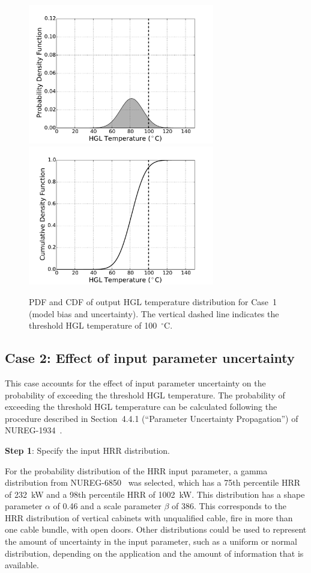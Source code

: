 \documentclass[12pt]{article}
\begin{document}
\begin{figure}[p]
\includegraphics[width=3.2in]{Figures/output_PDF_1_model}
\includegraphics[width=3.2in]{Figures/output_CDF_1_model}
\caption{PDF and CDF of output HGL temperature distribution for Case~1 (model bias and uncertainty). The vertical dashed line indicates the threshold HGL temperature of 100~$^\circ$C.}
\label{fig:case_1_output_distributions}
\end{figure}

\clearpage


\subsection{Case 2: Effect of input parameter uncertainty}

This case accounts for the effect of input parameter uncertainty on the probability of exceeding the threshold HGL temperature. The probability of exceeding the threshold HGL temperature can be calculated following the procedure described in Section~4.4.1 (``Parameter Uncertainty Propagation'') of NUREG-1934~\cite{NUREG_1934}.

\textbf{Step 1}: Specify the input HRR distribution.

For the probability distribution of the HRR input parameter, a gamma distribution from NUREG-6850~\cite{NUREG_6850} was selected, which has a 75th percentile HRR of 232~kW and a 98th percentile HRR of 1002~kW. This distribution has a shape parameter $\alpha$ of 0.46 and a scale parameter $\beta$ of 386. This corresponds to the HRR distribution of vertical cabinets with unqualified cable, fire in more than one cable bundle, with open doors. Other distributions could be used to represent the amount of uncertainty in the input parameter, such as a uniform or normal distribution, depending on the application and the amount of information that is available.
\end{document}
